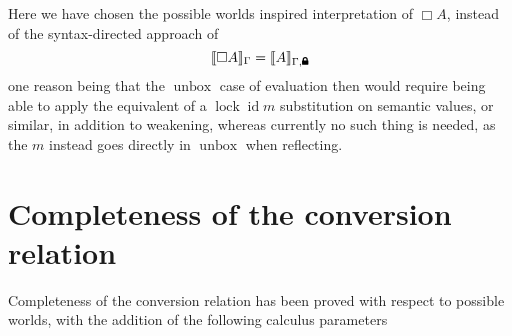 \documentclass{article}
\newcommand{\lock}{
  \text{\tikz[baseline]{
      \fill[rounded corners=.1ex] (-.75ex,0) rectangle ++(1.5ex,1ex);
      \draw[line width=.3ex] (-.45ex,.5ex) -- ++(0,.75ex) arc (180:0:.45ex) -- ++(0,-.75ex);
}}}
\DeclareMathOperator\unbox{unbox}
\begin{document}
Here we have chosen the possible worlds inspired interpretation of $\Box A$,
instead of the syntax-directed approach of
$$ \llbracket \Box A \rrbracket_\Gamma = \llbracket A \rrbracket_{\Gamma, \lock}$$
one reason being that the $\unbox$ case of evaluation then would require
being able to apply the equivalent of a $\operatorname{lock} \operatorname{id} m$ substitution
on semantic values, or similar, in addition to weakening,
whereas currently no such thing is needed,
as the $m$ instead goes directly in $\unbox$ when reflecting.

\section{Completeness of the conversion relation}

Completeness of the conversion relation has been proved with respect to possible worlds,
with the addition of the following calculus parameters
\end{document}

